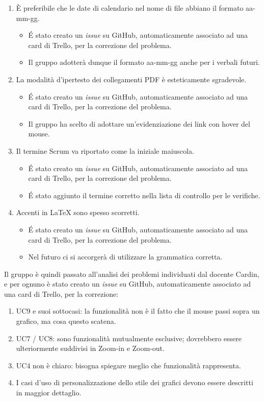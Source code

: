 \begin{enumerate}
	\item È preferibile che le date di calendario nel nome di file abbiano il formato aa-mm-gg.
	\begin{itemize}
		\item \'E stato creato un \textit{issue} su GitHub, automaticamente associato ad una card di Trello, per la correzione del problema.
		\item Il gruppo adotterà dunque il formato aa-mm-gg anche per i verbali futuri.
	\end{itemize}
	\item La modalità d'ipertesto dei collegamenti PDF è esteticamente sgradevole.
	\begin{itemize}
		\item \'E stato creato un \textit{issue} su GitHub, automaticamente associato ad una card di Trello, per la correzione del problema.
		\item Il gruppo ha scelto di adottare un'evidenziazione dei link con hover del mouse.
	\end{itemize}
	\item Il termine Scrum va riportato come la iniziale maiuscola.
	\begin{itemize}
		\item \'E stato creato un \textit{issue} su GitHub, automaticamente associato ad una card di Trello, per la correzione del problema.
		\item \'E stato aggiunto il termine corretto nella lista di controllo per le verifiche.
	\end{itemize}
	\item Accenti in LaTeX sono spesso scorretti.
	\begin{itemize}
		\item \'E stato creato un \textit{issue} su GitHub, automaticamente associato ad una card di Trello, per la correzione del problema.
		\item Nel futuro ci si accorgerà di utilizzare la grammatica corretta.
	\end{itemize}
\end{enumerate}
\noindent
Il gruppo è quindi passato all'analisi dei problemi individuati dal docente Cardin, e per ognuno è stato creato un \textit{issue} su GitHub, automaticamente associato ad una card di Trello, per la correzione:
\begin{enumerate}
	\item UC9 e suoi sottocasi: la funzionalità non è il fatto che il mouse passi sopra un grafico, ma cosa questo scatena.
	\item UC7 / UC8: sono funzionalità mutualmente esclusive; dovrebbero essere ulteriormente
	suddivisi in Zoom-in e Zoom-out.
	\item UC4 non è chiaro: bisogna spiegare meglio che funzionalità rappresenta.
	\item I casi d’uso di personalizzazione dello stile dei grafici devono essere descritti in maggior dettaglio.
\end{enumerate}

